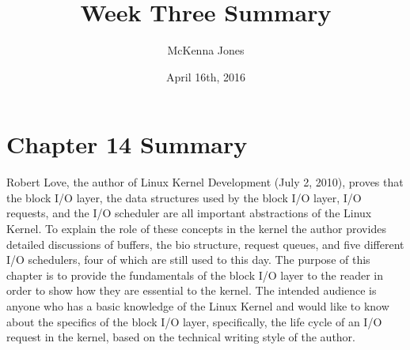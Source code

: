 \documentclass[letterpaper,10pt]{article}
\title{Week Three Summary}
\author{McKenna Jones}
\date{April 16th, 2016}
\begin{document}
\begin{titlepage}
\maketitle
\end{titlepage}

\section{Chapter 14 Summary}
Robert Love, the author of Linux Kernel Development (July 2, 2010), proves that the block I/O layer, the data structures used by the block I/O layer, I/O requests, and the I/O scheduler are all important abstractions of the Linux Kernel. To explain the role of these concepts in the kernel the author provides detailed discussions of buffers, the bio structure, request queues, and five different I/O schedulers, four of which are still used to this day. The purpose of this chapter is to provide the fundamentals of the block I/O layer to the reader in order to show how they are essential to the kernel. The intended audience is anyone who has a basic knowledge of the Linux Kernel and would like to know about the specifics of the block I/O layer, specifically, the life cycle of an I/O request in the kernel, based on the technical writing style of the author. 
\end{document}
